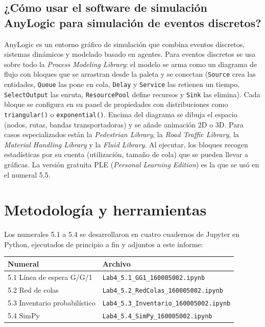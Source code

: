 \documentclass[11pt,letterpaper]{article}
\newcommand{\codigoEstudiante}{160005002}
\begin{document}
\subsection{¿Cómo usar el software de simulación AnyLogic para simulación de eventos discretos?}

AnyLogic es un entorno gráfico de simulación que combina eventos discretos, sistemas dinámicos y modelado
basado en agentes. Para eventos discretos se usa sobre todo la \emph{Process Modeling Library}: el modelo se
arma como un diagrama de flujo con bloques que se arrastran desde la paleta y se conectan
(\texttt{Source} crea las entidades, \texttt{Queue} las pone en cola, \texttt{Delay} y \texttt{Service} las
retienen un tiempo, \texttt{SelectOutput} las enruta, \texttt{ResourcePool} define recursos y \texttt{Sink}
las elimina). Cada bloque se configura en su panel de propiedades con distribuciones como
\texttt{triangular()} o \texttt{exponential()}. Encima del diagrama se dibuja el espacio (nodos, rutas,
bandas transportadoras) y se añade animación 2D o 3D. Para casos especializados están la \emph{Pedestrian
Library}, la \emph{Road Traffic Library}, la \emph{Material Handling Library} y la \emph{Fluid Library}. Al
ejecutar, los bloques recogen estadísticas por su cuenta (utilización, tamaño de cola) que se pueden llevar a
gráficas. La versión gratuita PLE (\emph{Personal Learning Edition}) es la que se usó en el numeral 5.5.

\section{Metodología y herramientas}

Los numerales 5.1 a 5.4 se desarrollaron en cuatro cuadernos de Jupyter en Python, ejecutados de principio a fin
y adjuntos a este informe:

\begin{center}
\begin{tabular}{@{}ll@{}}
\toprule
Numeral & Archivo \\
\midrule
5.1 Línea de espera G/G/1 & \texttt{Lab4\_5.1\_GG1\_\codigoEstudiante.ipynb} \\
5.2 Red de colas & \texttt{Lab4\_5.2\_RedColas\_\codigoEstudiante.ipynb} \\
5.3 Inventario probabilístico & \texttt{Lab4\_5.3\_Inventario\_\codigoEstudiante.ipynb} \\
5.4 SimPy & \texttt{Lab4\_5.4\_SimPy\_\codigoEstudiante.ipynb} \\
\bottomrule
\end{tabular}
\end{center}
\end{document}
